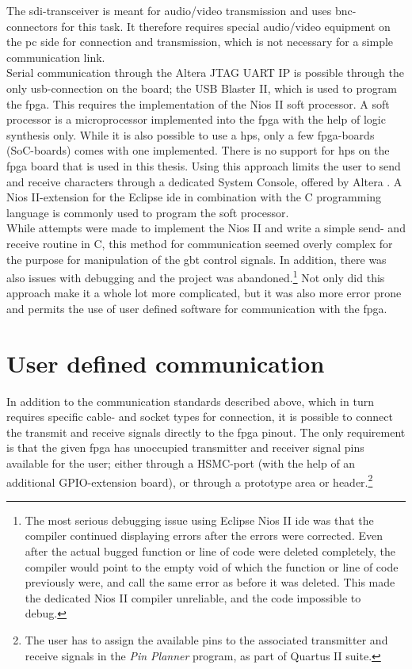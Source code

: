\documentclass[main.tex]{subfiles}
\begin{document}
The \acrshort{sdi}-transceiver is meant for audio/video transmission and uses \acrshort{bnc}-connectors for this task. It therefore requires special audio/video equipment on the \gls{pc} side for connection and transmission, which is not necessary for a simple communication link.\\

Serial communication through the Altera JTAG UART IP is possible through the only \acrshort{usb}-connection on the board; the USB Blaster II, which is used to program the \gls{fpga}. This requires the implementation of the Nios II soft processor. A soft processor is a microprocessor implemented into the \gls{fpga} with the help of logic synthesis only. While it is also possible to use a \gls{hps}, only a few \gls{fpga}-boards (SoC-boards) comes with one implemented. There is no support for \gls{hps} on the \gls{fpga} board that is used in this thesis. Using this approach limits the user to send and receive characters through a dedicated System Console, offered by Altera \cite{altera_terminals14}. A Nios II-extension for the Eclipse \acrshort{ide} in combination with the C programming language is commonly used to program the soft processor.\\

While attempts were made to implement the Nios II and write a simple send- and receive routine in C, this method for communication seemed overly complex for the purpose for manipulation of the \gls{gbt} control signals. In addition, there was also issues with debugging and the project was abandoned.\footnote{The most serious debugging issue using Eclipse Nios II \acrshort{ide} was that the compiler continued displaying errors after the errors were corrected. Even after the actual bugged function or line of code were deleted completely, the compiler would point to the empty void of which the function or line of code previously were, and call the same error as before it was deleted. This made the dedicated Nios II compiler unreliable, and the code impossible to debug.} Not only did this approach make it a whole lot more complicated, but it was also more error prone and permits the use of user defined software for communication with the \gls{fpga}.

\section{User defined communication}

In addition to the communication standards described above, which in turn requires specific cable- and socket types for connection, it is possible to connect the transmit and receive signals directly to the \gls{fpga} pinout. The only requirement is that the given \gls{fpga} has unoccupied transmitter and receiver signal pins available for the user; either through a HSMC-port (with the help of an additional GPIO-extension board), or through a prototype area or header.\footnote{The user has to assign the available pins to the associated transmitter and receive signals in the \textit{Pin Planner} program, as part of Quartus II suite.}\\
\end{document}

